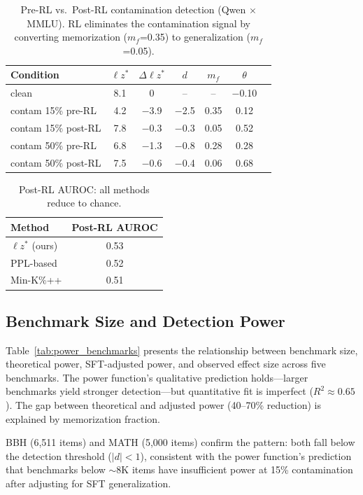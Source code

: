 \documentclass[11pt,a4paper]{article}
\newcommand{\lzstar}{\ensuremath{\ell z^*}}
\begin{document}
\begin{table}[t]
\centering
\small
\caption{Pre-RL vs.\ Post-RL contamination detection (Qwen $\times$ MMLU). RL eliminates the contamination signal by converting memorization ($m_f$=0.35) to generalization ($m_f$=0.05).}
\label{tab:post_rl}
\begin{tabular}{lcccccc}
\toprule
\textbf{Condition} & $\lzstar$ & $\Delta\lzstar$ & $d$ & $m_f$ & $\theta$ \\
\midrule
clean & 8.1 & 0 & -- & -- & $-$0.10 \\
contam 15\% pre-RL & 4.2 & $-$3.9 & $-$2.5 & 0.35 & 0.12 \\
contam 15\% post-RL & 7.8 & $-$0.3 & $-$0.3 & 0.05 & 0.52 \\
contam 50\% pre-RL & 6.8 & $-$1.3 & $-$0.8 & 0.28 & 0.28 \\
contam 50\% post-RL & 7.5 & $-$0.6 & $-$0.4 & 0.06 & 0.68 \\
\bottomrule
\end{tabular}
\end{table}

\begin{table}[t]
\centering
\small
\caption{Post-RL AUROC: all methods reduce to chance.}
\label{tab:baseline_auroc_postrl}
\begin{tabular}{lc}
\toprule
\textbf{Method} & \textbf{Post-RL AUROC} \\
\midrule
$\lzstar$ (ours) & 0.53 \\
PPL-based & 0.52 \\
Min-K\%++ & 0.51 \\
\bottomrule
\end{tabular}
\end{table}

\subsection{Benchmark Size and Detection Power}
\label{sec:power}

Table~\ref{tab:power_benchmarks} presents the relationship between benchmark size, theoretical power, SFT-adjusted power, and observed effect size across five benchmarks.
The power function's qualitative prediction holds---larger benchmarks yield stronger detection---but quantitative fit is imperfect ($R^2 \approx 0.65$).
The gap between theoretical and adjusted power (40--70\% reduction) is explained by memorization fraction.

BBH (6,511 items) and MATH (5,000 items) confirm the pattern: both fall below the detection threshold ($|d|<1$), consistent with the power function's prediction that benchmarks below $\sim$8K items have insufficient power at 15\% contamination after adjusting for SFT generalization.
\end{document}
